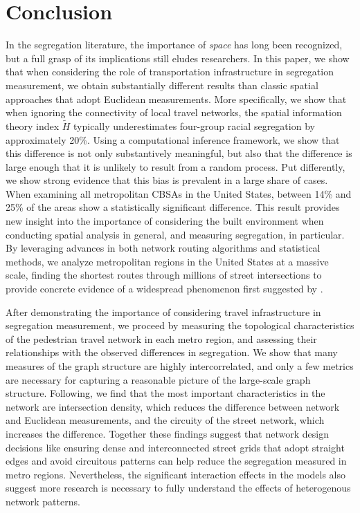 \documentclass[
  10pt,
]{article}
\begin{document}
\hypertarget{conclusion}{%
\section{Conclusion}\label{conclusion}}

In the segregation literature, the importance of \emph{space} has long
been recognized, but a full grasp of its implications still eludes
researchers. In this paper, we show that when considering the role of
transportation infrastructure in segregation measurement, we obtain
substantially different results than classic spatial approaches that
adopt Euclidean measurements. More specifically, we show that when
ignoring the connectivity of local travel networks, the spatial
information theory index \(\tilde{H}\) typically underestimates
four-group racial segregation by approximately 20\%. Using a
computational inference framework, we show that this difference is not
only substantively meaningful, but also that the difference is large
enough that it is unlikely to result from a random process. Put
differently, we show strong evidence that this bias is prevalent in a
large share of cases. When examining all metropolitan CBSAs in the
United States, between 14\% and 25\% of the areas show a statistically
significant difference. This result provides new insight into the
importance of considering the built environment when conducting spatial
analysis in general, and measuring segregation, in particular. By
leveraging advances in both network routing algorithms and statistical
methods, we analyze metropolitan regions in the United States at a
massive scale, finding the shortest routes through millions of street
intersections to provide concrete evidence of a widespread phenomenon
first suggested by \citet{roberto2018SpatialProximity}.

After demonstrating the importance of considering travel infrastructure
in segregation measurement, we proceed by measuring the topological
characteristics of the pedestrian travel network in each metro region,
and assessing their relationships with the observed differences in
segregation. We show that many measures of the graph structure are
highly intercorrelated, and only a few metrics are necessary for
capturing a reasonable picture of the large-scale graph structure.
Following, we find that the most important characteristics in the
network are intersection density, which reduces the difference between
network and Euclidean measurements, and the circuity of the street
network, which increases the difference. Together these findings suggest
that network design decisions like ensuring dense and interconnected
street grids that adopt straight edges and avoid circuitous patterns can
help reduce the segregation measured in metro regions. Nevertheless, the
significant interaction effects in the models also suggest more research
is necessary to fully understand the effects of heterogenous network
patterns.
\end{document}
